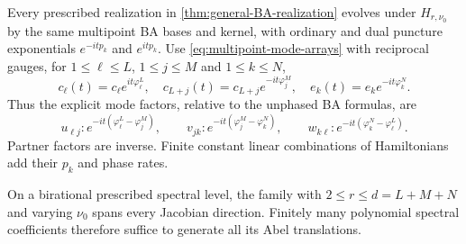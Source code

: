 \begin{theorem}\label{thm:BA-higher-flows}
Every prescribed realization in \cref{thm:general-BA-realization}
evolves under $H_{r,\nu_0}$ by the same multipoint BA bases and
kernel, with ordinary and dual puncture exponentials
$e^{-itp_k}$ and $e^{itp_k}$.
Use \cref{eq:multipoint-mode-arrays} with reciprocal gauges, for
$1\leq\ell\leq L$, $1\leq j\leq M$ and $1\leq k\leq N$,
\begin{equation}\label{eq:multipoint-higher-gauges}
 c_{\ell}(t)=c_{\ell} e^{it\varphi_{\ell}^L},\quad
 c_{L+j}(t)=c_{L+j}e^{-it\varphi_j^M},\quad
 e_k(t)=e_k e^{-it\varphi_k^N}.
\end{equation}
Thus the explicit mode factors, relative to the unphased BA formulas,
are
\begin{equation}\label{eq:multipoint-higher-phases}
 u_{\ell j}:e^{-it(\varphi_{\ell}^L-\varphi_j^M)},\qquad
 v_{jk}:e^{-it(\varphi_j^M-\varphi_k^N)},\qquad
 w_{k\ell}:e^{-it(\varphi_k^N-\varphi_{\ell}^L)}.
\end{equation}
Partner factors are inverse. Finite constant linear combinations
of Hamiltonians add their $p_k$ and phase rates.

On a birational prescribed spectral level, the family with
$2\leq r\leq d=L+M+N$ and varying $\nu_0$ spans every Jacobian
direction. Finitely many polynomial spectral coefficients therefore
suffice to generate all its Abel translations.
\end{theorem}
